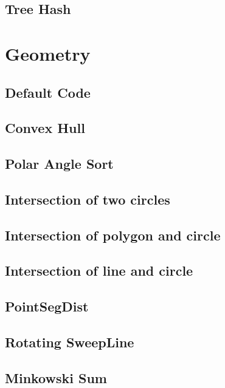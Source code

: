 \subsection{Tree Hash}



\section{Geometry}
\subsection{Default Code}

\subsection{Convex Hull}

\subsection{Polar Angle Sort}

\subsection{Intersection of two circles}

\subsection{Intersection of polygon and circle}

\subsection{Intersection of line and circle}

\subsection{PointSegDist}

\subsection{Rotating SweepLine}

\subsection{Minkowski Sum}

